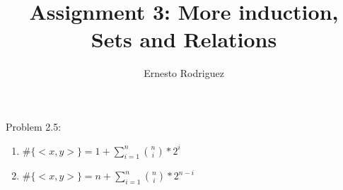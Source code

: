 \documentclass{article}
\title{Assignment 3: More induction, Sets and Relations}
\author{Ernesto Rodriguez}
\begin{document}
\maketitle

Problem 2.5:

\begin{enumerate}

\item{$\#\{<x,y>\}=1+\sum_{i=1}^n {{n}\choose {i}}*2^{i}$}

\item{$\#\{<x,y>\}=n+\sum_{i=1}^n {{n}\choose {i}}*2^{n-i}$}

\end{enumerate}
\end{document}
